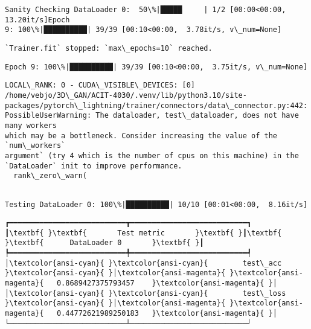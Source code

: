 \documentclass[11pt]{article}
\begin{document}
    \begin{Verbatim}[commandchars=\\\{\}]
Sanity Checking DataLoader 0:  50\%|█████     | 1/2 [00:00<00:00, 13.20it/s]Epoch
9: 100\%|██████████| 39/39 [00:10<00:00,  3.78it/s, v\_num=None]
    \end{Verbatim}

    \begin{Verbatim}[commandchars=\\\{\}]
`Trainer.fit` stopped: `max\_epochs=10` reached.
    \end{Verbatim}

    \begin{Verbatim}[commandchars=\\\{\}]
Epoch 9: 100\%|██████████| 39/39 [00:10<00:00,  3.75it/s, v\_num=None]
    \end{Verbatim}

    \begin{Verbatim}[commandchars=\\\{\}]
LOCAL\_RANK: 0 - CUDA\_VISIBLE\_DEVICES: [0]
/home/vebjo/3D\_GAN/ACIT-4030/.venv/lib/python3.10/site-
packages/pytorch\_lightning/trainer/connectors/data\_connector.py:442:
PossibleUserWarning: The dataloader, test\_dataloader, does not have many workers
which may be a bottleneck. Consider increasing the value of the `num\_workers`
argument` (try 4 which is the number of cpus on this machine) in the
`DataLoader` init to improve performance.
  rank\_zero\_warn(
    \end{Verbatim}

    \begin{Verbatim}[commandchars=\\\{\}]

Testing DataLoader 0: 100\%|██████████| 10/10 [00:01<00:00,  8.16it/s]
    \end{Verbatim}

    
    \begin{Verbatim}[commandchars=\\\{\}]
┏━━━━━━━━━━━━━━━━━━━━━━━━━━━┳━━━━━━━━━━━━━━━━━━━━━━━━━━━┓
┃\textbf{ }\textbf{       Test metric       }\textbf{ }┃\textbf{ }\textbf{      DataLoader 0       }\textbf{ }┃
┡━━━━━━━━━━━━━━━━━━━━━━━━━━━╇━━━━━━━━━━━━━━━━━━━━━━━━━━━┩
│\textcolor{ansi-cyan}{ }\textcolor{ansi-cyan}{        test\_acc         }\textcolor{ansi-cyan}{ }│\textcolor{ansi-magenta}{ }\textcolor{ansi-magenta}{   0.8689427375793457    }\textcolor{ansi-magenta}{ }│
│\textcolor{ansi-cyan}{ }\textcolor{ansi-cyan}{        test\_loss        }\textcolor{ansi-cyan}{ }│\textcolor{ansi-magenta}{ }\textcolor{ansi-magenta}{   0.44772621989250183   }\textcolor{ansi-magenta}{ }│
└───────────────────────────┴───────────────────────────┘

    \end{Verbatim}
\end{document}
